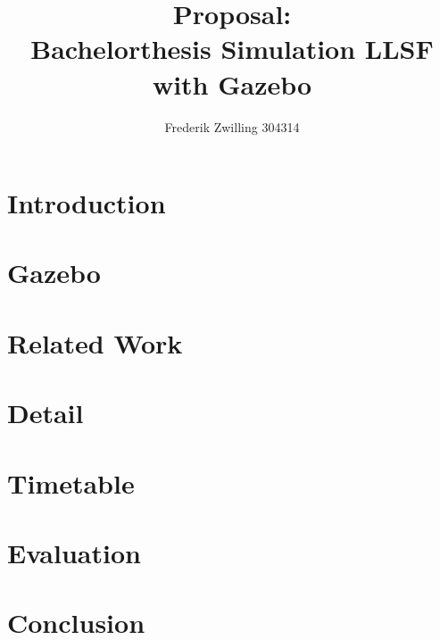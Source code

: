 \documentclass[11pt,a4paper,titlepage]{article}
\author{Frederik Zwilling 304314}
\title{Proposal:\\ Bachelorthesis Simulation LLSF with Gazebo}
\begin{document}
\maketitle
\thispagestyle{empty}
\tableofcontents
\newpage
\onehalfspace

\section{Introduction}
\section{Gazebo}
\section{Related Work}
\section{Detail}
\section{Timetable}
\section{Evaluation}
\section{Conclusion}
\end{document}
